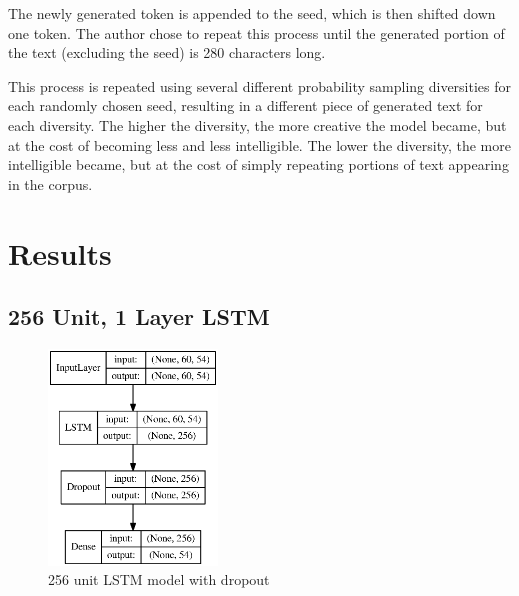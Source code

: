 \documentclass[letterpaper]{article}
\begin{document}
        The newly generated token is appended to the seed, which is then shifted down one token. The author chose to repeat this process until the generated portion of the text (excluding the seed) is 280 characters long.

        This process is repeated using several different probability sampling diversities for each randomly chosen seed, resulting in a different piece of generated text for each diversity. The higher the diversity, the more creative the model became, but at the cost of becoming less and less intelligible. The lower the diversity, the more intelligible became, but at the cost of simply repeating portions of text appearing in the corpus.

\section{Results}
    \subsection{256 Unit, 1 Layer LSTM}

        \begin{figure}[h]
            \centering
            \includegraphics[width=0.4\textwidth]{figures/256dropout.eps}
            \caption{256 unit LSTM model with dropout}\label{fig:archetecture-256}
        \end{figure}
\end{document}

